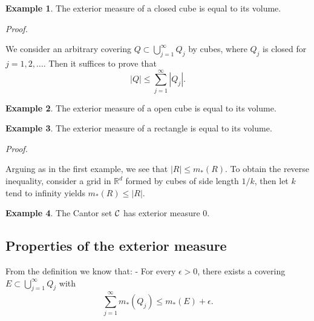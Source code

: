\documentclass[
]{book}
\theoremstyle{definition}
\theoremstyle{definition}
\newtheorem{example}{Example}[chapter]
\theoremstyle{definition}
\theoremstyle{definition}
\theoremstyle{remark}
\begin{document}
\begin{example}
The exterior measure of a closed cube is equal to its volume.
\end{example}

\emph{Proof.}

We consider an arbitrary covering \(Q\subset \bigcup_{j=1}^{\infty}Q_j\) by cubes, where \(Q_j\) is closed for \(j=1,2,\dots\). Then it suffices to prove that
\[
  |Q|\leq \sum_{j=1}^{\infty}|Q_j|.
  \]

\begin{example}
The exterior measure of a open cube is equal to its volume.
\end{example}

\begin{example}
The exterior measure of a rectangle is equal to its volume.
\end{example}

\emph{Proof.}

Arguing as in the first example, we see that \(|R|\leq m_{\ast}(R)\). To obtain the reverse inequality, consider a grid in \(\mathbb{R}^d\) formed by cubes of side length \(1/k\), then let \(k\) tend to infinity yields \(m_{\ast}(R)\leq |R|\).

\begin{example}
The Cantor set \(\cal C\) has exterior measure 0.
\end{example}

\subsection{Properties of the exterior measure}\label{properties-of-the-exterior-measure}

From the definition we know that:
- For every \(\epsilon>0\), there exists a covering \(E\subset \bigcup_{j=1}^{\infty}Q_j\) with
\[
\sum_{j=1}^{\infty}m_{\ast}(Q_j)\leq m_{\ast}(E)+\epsilon.
\]
\end{document}
